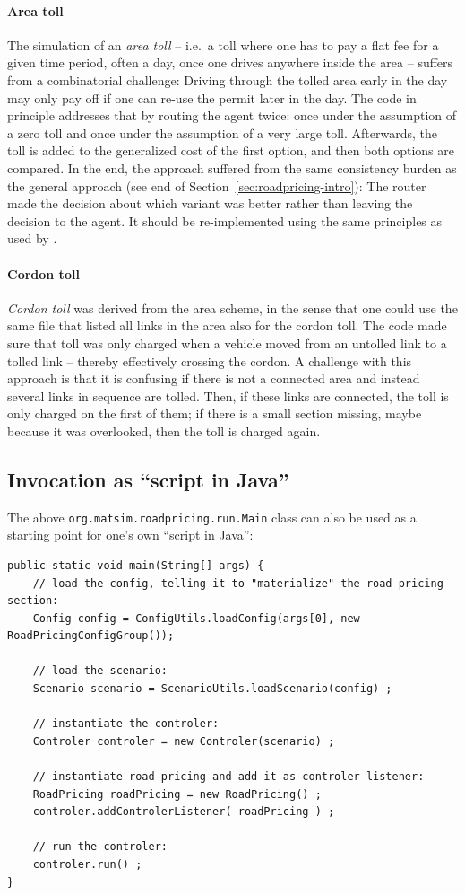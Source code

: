 \paragraph{Area toll} The simulation of an \emph{area toll} -- i.e.\ a toll where one has to pay a flat fee for a given time period, often a day, once one drives anywhere inside the area -- suffers from a combinatorial challenge: Driving through the tolled area early in the day may only pay off if one can re-use the permit later in the day.  The code in principle addresses that by routing the agent twice: once under the assumption of a zero toll and once under the assumption of a very large toll.  Afterwards, the toll is added to the generalized cost of the first option, and then both options are compared.  
%
In the end, the approach suffered from the same consistency burden as the general approach (see end of Section~\ref{sec:roadpricing-intro}): The router made the decision about which variant was better rather than leaving the decision to the agent.  It should be re-implemented using the same principles as used by \citet{NagelEtAl_PCS_2014}.

\paragraph{Cordon toll}

\emph{Cordon toll} was derived from the area scheme, in the sense that one could use the same file that listed all links in the area also for the cordon toll.  The code made sure that toll was only charged when a vehicle moved from an untolled link to a tolled link -- thereby effectively crossing the cordon.  A challenge with this approach is that it is confusing if there is not a connected area and instead several links in sequence are tolled.  Then, if these links are connected, the toll is only charged on the first of them; if there is a small section missing, maybe because it was overlooked, then the toll is charged again. 



\subsection{Invocation as ``script in Java''}

The above \lstinline$org.matsim.roadpricing.run.Main$ class can also be used as a starting point for one's own ``script in Java'':
\begin{lstlisting}
public static void main(String[] args) {
	// load the config, telling it to "materialize" the road pricing section:
	Config config = ConfigUtils.loadConfig(args[0], new RoadPricingConfigGroup());
	
	// load the scenario:
	Scenario scenario = ScenarioUtils.loadScenario(config) ;

	// instantiate the controler:
	Controler controler = new Controler(scenario) ;

	// instantiate road pricing and add it as controler listener:
	RoadPricing roadPricing = new RoadPricing() ;
	controler.addControlerListener( roadPricing ) ;

	// run the controler:
	controler.run() ;
}
\end{lstlisting}


